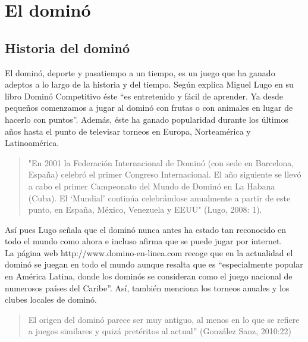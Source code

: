 

\section{El dominó}

\subsection{Historia del dominó}

El dominó, deporte y pasatiempo a un tiempo, es un juego que ha ganado adeptos a lo largo de la historia
y del tiempo. Según explica Miguel Lugo en su libro Dominó Competitivo éste “es entretenido y fácil de
aprender. Ya desde pequeños comenzamos a jugar al dominó con frutas o con animales en lugar de hacerlo
con puntos”. Además, éste ha ganado popularidad durante los últimos años hasta el punto de televisar
torneos en Europa, Norteamérica y Latinoamérica. \\

\begin{quote}
"En 2001 la Federación Internacional de Dominó (con sede en Barcelona, España) celebró el primer
Congreso Internacional. El año siguiente se llevó a cabo el primer Campeonato del Mundo de Dominó en La
Habana (Cuba). El ‘Mundial’ continúa celebrándose anualmente a partir de este punto, en España, México,
Venezuela y EEUU" (Lugo, 2008: 1).
\end{quote}

Así pues Lugo señala que el dominó nunca antes ha estado tan reconocido en todo el mundo como ahora e
incluso afirma que se puede jugar por internet. \\

La página web http://www.domino-en-linea.com recoge que en la actualidad el dominó se juegan en todo el
mundo aunque resalta que es “especialmente popular en América Latina, donde los dominós se consideran
como el juego nacional de numerosos países del Caribe”. Así, también menciona los torneos anuales y
los clubes locales de dominó. \\

\begin{quote}
El origen del dominó parece ser muy antiguo, al menos en lo que se refiere a juegos similares y quizá
pretéritos al actual” (González Sanz, 2010:22)
\end{quote}

